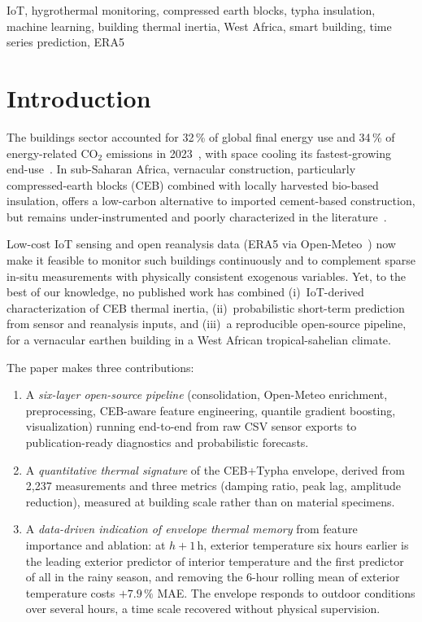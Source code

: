 \documentclass[conference]{IEEEtran}
\newcommand{\ceb}{CEB+Typha\xspace}
\begin{document}
\begin{IEEEkeywords}
IoT, hygrothermal monitoring, compressed earth blocks, typha insulation,
machine learning, building thermal inertia, West Africa, smart building,
time series prediction, ERA5
\end{IEEEkeywords}

\section{Introduction}
\label{sec:intro}

The buildings sector accounted for 32\,\% of global final energy use
and 34\,\% of energy-related CO$_2$ emissions in 2023~\cite{gsr2025},
with space cooling its fastest-growing end-use~\cite{iea2018cooling}.
In sub-Saharan Africa, vernacular construction, particularly
compressed-earth blocks (CEB) combined with locally harvested bio-based
insulation, offers a low-carbon alternative to imported cement-based
construction, but remains under-instrumented and poorly characterized
in the literature~\cite{morel2001}.

Low-cost IoT sensing and open reanalysis data (ERA5 via
Open-Meteo~\cite{zippenfenig2023}) now make it feasible to monitor such
buildings continuously and to complement sparse in-situ measurements
with physically consistent exogenous variables. Yet, to the best of our
knowledge, no published work has combined (i)~IoT-derived
characterization of CEB thermal inertia, (ii)~probabilistic short-term
prediction from sensor and reanalysis inputs, and (iii)~a reproducible
open-source pipeline, for a vernacular earthen building in a West
African tropical-sahelian climate.

The paper makes three contributions:

\begin{enumerate}
\item A \textit{six-layer open-source pipeline} (consolidation,
  Open-Meteo enrichment, preprocessing, CEB-aware feature engineering,
  quantile gradient boosting, visualization) running end-to-end from
  raw CSV sensor exports to publication-ready diagnostics and
  probabilistic forecasts.

\item A \textit{quantitative thermal signature} of the \ceb envelope,
  derived from 2,237 measurements and three metrics (damping ratio,
  peak lag, amplitude reduction), measured at building scale rather
  than on material specimens.

\item A \textit{data-driven indication of envelope thermal memory} from
  feature importance and ablation: at $h{+}1$\,h, exterior temperature
  six hours earlier is the leading exterior predictor of interior
  temperature and the first predictor of all in the rainy season, and
  removing the 6-hour rolling mean of exterior temperature costs
  $+7.9\,\%$ MAE. The envelope responds to outdoor conditions over
  several hours, a time scale recovered without physical supervision.
\end{enumerate}
\end{document}
